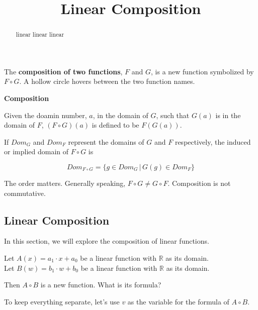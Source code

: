 \documentclass{ximera}
\title{Linear Composition}
\begin{document}
\begin{abstract}
linear linear linear
\end{abstract}
\maketitle


The \textbf{\textcolor{purple!85!blue}{composition of two functions}}, $F$ and $G$, is a new function symbolized by $F \circ G$. A hollow circle hovers between the two function names.


\begin{idea} \textbf{\textcolor{blue!55!black}{Composition}} 


Given the doamin number, $a$, in the domain of $G$, such that $G(a)$ is in the domain of $F$, $(F \circ G)(a)$ is defined to be  $F(G(a))$.


If $Dom_G$ and $Dom_F$ represent the domains of $G$ and $F$ respectively, the induced or implied domain of $F \circ G$ is 




\[  Dom_{F \circ G} = \{  g \in  Dom_G  \,   |   \,   G(g) \in Dom_F                 \}           \]

\end{idea}

The order matters.  Generally speaking, $F \circ G \ne G \circ F$. Composition is not commutative.


















\subsection*{Linear Composition}

In this section, we will explore the composition of linear functions. 


Let $A(x) = a_1 \cdot x + a_0$ be a linear function with $\mathbb{R}$ as its domain. \\
Let $B(w) = b_1 \cdot w + b_0$ be a linear function with $\mathbb{R}$ as its domain. 


Then $A \circ B$ is a new function. What is its formula? 

To keep everything separate, let's use $v$ as the variable for the formula of $A \circ B$.
\end{document}
